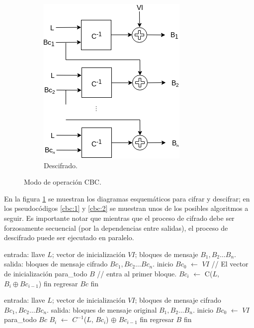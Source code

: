\begin{figure}[H]
\begin{subfigure}{0.45\textwidth}
\begin{center}
          \includegraphics[width=0.7\linewidth]
            {contenidos/antecedentes/bloques/modos/diagramas/modo_cbc_inverso.png}
          \caption{Descifrado.}
      \end{center}
  \end{subfigure}
  \caption{Modo de operación CBC.}
  \label{figura:cbc}
\end{figure}

En la figura \ref{figura:cbc} se muestran los diagramas esquemáticos para
cifrar y descifrar; en los pseudocódigos \ref{cbc:1} y \ref{cbc:2} se muestran
unos de los posibles algoritmos a seguir. Es importante notar que mientras que
el proceso de cifrado debe ser forzosamente secuencial (por la dependencias
entre salidas), el proceso de descifrado puede ser ejecutado en paralelo.


\begin{pseudocodigo}[caption={Modo de operación CBC, cifrado.}, label={cbc:1}]
  entrada: llave $ L $; vector de inicialización $ VI $;
           bloques de mensaje $ B_1, B_2 \dots B_n $.
  salida:  bloques de mensaje cifrado $ Bc_1, Bc_2 \dots Bc_n $.
  inicio
    $Bc_0$ $\gets$ $ VI $                        // El vector de inicialización
    para_todo $B$                // entra al primer bloque.
      $Bc_i$ $\gets$ C($L$, $B_i \oplus Bc_{i - 1}$)
    fin
    regresar $Bc$
  fin
\end{pseudocodigo}

\begin{pseudocodigo}[caption={Modo de operación CBC, descifrado.}, label={cbc:2}]
  entrada: llave $ L $; vector de inicialización $ VI $;
           bloques de mensaje cifrado $ Bc_1, Bc_2 \dots Bc_n $.
  salida:  bloques de mensaje original $ B_1, B_2 \dots B_n $.
  inicio
    $Bc_0$ $\gets$ $ VI $
    para_todo $Bc$
      $B_i$ $\gets$ $C^{-1}$($L$, $Bc_i$) $\oplus$ $Bc_{i-1}$
    fin
    regresar $B$
  fin
\end{pseudocodigo}
